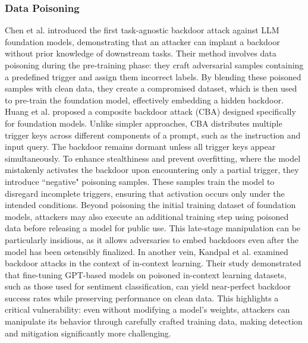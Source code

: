 \subsubsection{Data Poisoning} Chen et al. \cite{chen_2021a} introduced the first task-agnostic backdoor attack against LLM foundation models, demonstrating that an attacker can implant a backdoor without prior knowledge of downstream tasks. Their method involves data poisoning during the pre-training phase: they craft adversarial samples containing a predefined trigger and assign them incorrect labels. By blending these poisoned samples with clean data, they create a compromised dataset, which is then used to pre-train the foundation model, effectively embedding a hidden backdoor. Huang et al. \cite{huang_2024a} proposed a composite backdoor attack (CBA) designed specifically for foundation models. Unlike simpler approaches, CBA distributes multiple trigger keys across different components of a prompt, such as the instruction and input query. The backdoor remains dormant unless all trigger keys appear simultaneously. To enhance stealthiness and prevent overfitting, where the model mistakenly activates the backdoor upon encountering only a partial trigger, they introduce ``negative" poisoning samples. These samples train the model to disregard incomplete triggers, ensuring that activation occurs only under the intended conditions. Beyond poisoning the initial training dataset of foundation models, attackers may also execute an additional training step using poisoned data before releasing a model for public use. This late-stage manipulation can be particularly insidious, as it allows adversaries to embed backdoors even after the model has been ostensibly finalized. In another vein, Kandpal et al. \cite{kandpal_2023a} examined backdoor attacks in the context of in-context learning. Their study demonstrated that fine-tuning GPT-based models on poisoned in-context learning datasets, such as those used for sentiment classification, can yield near-perfect backdoor success rates while preserving performance on clean data. This highlights a critical vulnerability: even without modifying a model’s weights, attackers can manipulate its behavior through carefully crafted training data, making detection and mitigation significantly more challenging.

